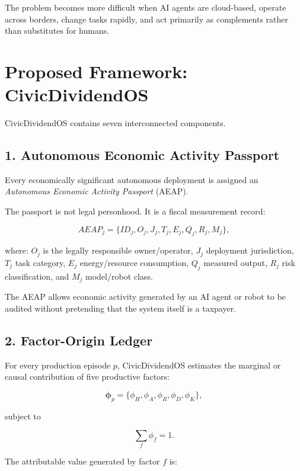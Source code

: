 \documentclass[conference]{IEEEtran}
\begin{document}
The problem becomes more difficult when AI agents are cloud-based, operate
across borders, change tasks rapidly, and act primarily as complements rather
than substitutes for humans.

\section{Proposed Framework: CivicDividendOS}

CivicDividendOS contains seven interconnected components.

\subsection{1. Autonomous Economic Activity Passport}

Every economically significant autonomous deployment is assigned an
\textit{Autonomous Economic Activity Passport} (AEAP).

The passport is not legal personhood. It is a fiscal measurement record:

\begin{equation}
AEAP_j =
\{ID_j,O_j,J_j,T_j,E_j,Q_j,R_j,M_j\},
\end{equation}

where:
$O_j$ is the legally responsible owner/operator,
$J_j$ deployment jurisdiction,
$T_j$ task category,
$E_j$ energy/resource consumption,
$Q_j$ measured output,
$R_j$ risk classification, and
$M_j$ model/robot class.

The AEAP allows economic activity generated by an AI agent or robot to be
audited without pretending that the system itself is a taxpayer.

\subsection{2. Factor-Origin Ledger}

For every production episode $p$, CivicDividendOS estimates the marginal or
causal contribution of five productive factors:

\begin{equation}
\boldsymbol{\phi}_p =
\{\phi_H,\phi_A,\phi_R,\phi_D,\phi_K\},
\end{equation}

subject to

\begin{equation}
\sum_f \phi_f = 1.
\end{equation}

The attributable value generated by factor $f$ is:
\end{document}

